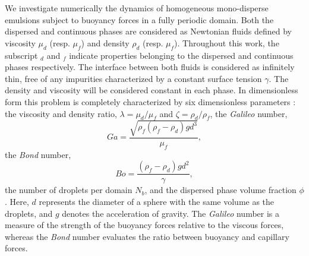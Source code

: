 We investigate numerically the dynamics of homogeneous mono-disperse emulsions subject to buoyancy forces in a fully periodic domain. 
Both the dispersed and continuous phases are considered as Newtonian fluids defined by viscosity $\mu_d$ (resp. $\mu_f$) and density $\rho_d$ (resp. $\mu_f$).
Throughout this work, the subscript $_d$ and $_f$ indicate properties belonging to the dispersed and continuous phases respectively. 
The interface between both fluids is considered as infinitely thin, free of any impurities characterized by a constant surface tension $\gamma$. %
The density and viscosity will be considered constant in each phase.
In dimensionless form this problem is completely characterized by six dimensionless parameters :  the viscosity and density ratio, $\lambda = \mu_d / \mu_f$ and $\zeta = \rho_d / \rho_f$,  
the \textit{Galileo} number, 
\begin{equation*}
    Ga =\frac{\sqrt{\rho_f(\rho_f - \rho_d) g d^3}}{\mu_f},
\end{equation*}
the \textit{Bond} number, 
\begin{equation*}
    Bo =\frac{(\rho_f - \rho_d) g d^2}{\gamma},
\end{equation*}
the number of droplets per domain $N_b$, and the dispersed phase volume fraction $\phi$. 
Here, $d$ represents the diameter of a sphere with the same volume as the droplets, and $g$ denotes the acceleration of gravity.
The \textit{Galileo} number is a measure of the strength of the buoyancy forces relative to the viscous forces, whereas the \textit{Bond} number evaluates the ratio between buoyancy and capillary forces. 

